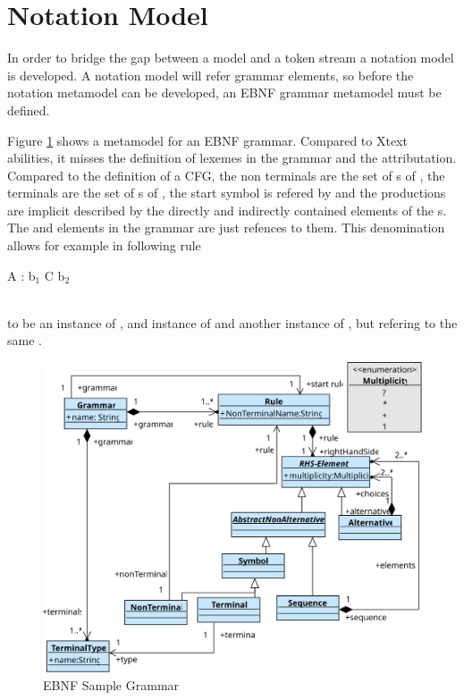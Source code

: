 \section{Notation Model}
In order to bridge the gap between a model and a token stream a notation model is developed. A notation model will refer grammar elements, so before the notation metamodel can be developed, an EBNF grammar metamodel must be defined. 

Figure \ref{MM:GrammarUML} shows a metamodel for an EBNF grammar. Compared to Xtext abilities, it misses the definition of lexemes in the grammar and the attributation. Compared to the definition of a CFG, the non terminals are the set of s of , the terminals are the set of s of , the start symbol is  refered by  and the productions are implicit described by the directly and indirectly contained elements of the s. The  and  elements in the grammar are just refences to them. This denomination allows for example in following rule
\\\begin{code}
A : b$_1$ C b$_2$
\end{code}\\

to be  an instance of ,  and instance of  and  another instance of , but refering to the same .

\begin{figure}
\centering
\includegraphics[scale=0.8]{gfx/ex/GrammarUML} 
\caption{EBNF Sample Grammar}
\label{MM:GrammarUML}
\end{figure}


